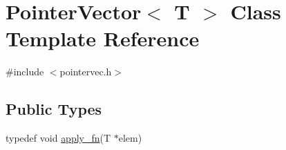 \hypertarget{classPointerVector}{}\section{Pointer\+Vector$<$ T $>$ Class Template Reference}
\label{classPointerVector}


{\ttfamily \#include $<$pointervec.\+h$>$}

\subsection*{Public Types}
\begin{DoxyCompactItemize}
\item 
typedef void \hyperlink{classPointerVector_a578da527d71168684229a721b16e823f}{apply\+\_\+fn}(T $\ast$elem)
\end{DoxyCompactItemize}
